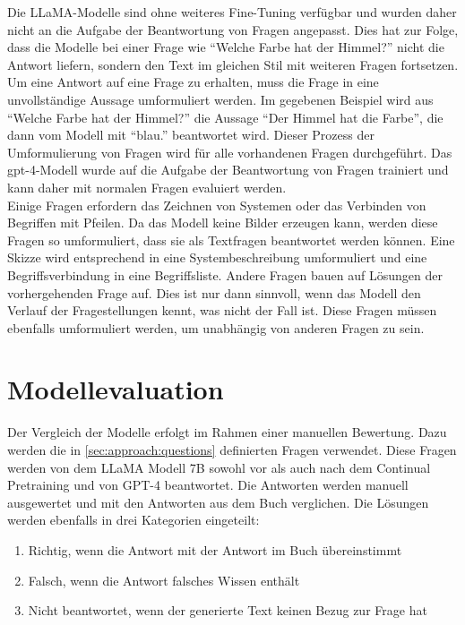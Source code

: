 Die LLaMA-Modelle sind ohne weiteres Fine-Tuning verfügbar und wurden daher nicht an die Aufgabe der Beantwortung von Fragen angepasst.
Dies hat zur Folge, dass die Modelle bei einer Frage wie \enquote{Welche Farbe hat der Himmel?} nicht die Antwort liefern, sondern den Text im gleichen Stil mit weiteren Fragen fortsetzen.
Um eine Antwort auf eine Frage zu erhalten, muss die Frage in eine unvollständige Aussage umformuliert werden.
Im gegebenen Beispiel wird aus \enquote{Welche Farbe hat der Himmel?} die Aussage \enquote{Der Himmel hat die Farbe}, die dann vom Modell mit \enquote{blau.} beantwortet wird.
Dieser Prozess der Umformulierung von Fragen wird für alle vorhandenen Fragen durchgeführt.
Das \ac{gpt}-4-Modell wurde auf die Aufgabe der Beantwortung von Fragen trainiert und kann daher mit normalen Fragen evaluiert werden.\\

Einige Fragen erfordern das Zeichnen von Systemen oder das Verbinden von Begriffen mit Pfeilen.
Da das Modell keine Bilder erzeugen kann, werden diese Fragen so umformuliert, dass sie als Textfragen beantwortet werden können.
Eine Skizze wird entsprechend in eine Systembeschreibung umformuliert und eine Begriffsverbindung in eine Begriffsliste.
Andere Fragen bauen auf Lösungen der vorhergehenden Frage auf.
Dies ist nur dann sinnvoll, wenn das Modell den Verlauf der Fragestellungen kennt, was nicht der Fall ist.
Diese Fragen müssen ebenfalls umformuliert werden, um unabhängig von anderen Fragen zu sein.

\section{Modellevaluation}\label{sec:approach:comparison}
Der Vergleich der Modelle erfolgt im Rahmen einer manuellen Bewertung.
Dazu werden die in \cref{sec:approach:questions} definierten Fragen verwendet.
Diese Fragen werden von dem LLaMA Modell 7B sowohl vor als auch nach dem Continual Pretraining und von GPT-4 beantwortet.
Die Antworten werden manuell ausgewertet und mit den Antworten aus dem Buch \citet{bb} verglichen.
Die Lösungen werden ebenfalls in drei Kategorien eingeteilt:
\begin{enumerate}
    \item Richtig, wenn die Antwort mit der Antwort im Buch übereinstimmt
    \item Falsch, wenn die Antwort falsches Wissen enthält
    \item Nicht beantwortet, wenn der generierte Text keinen Bezug zur Frage hat
\end{enumerate}

